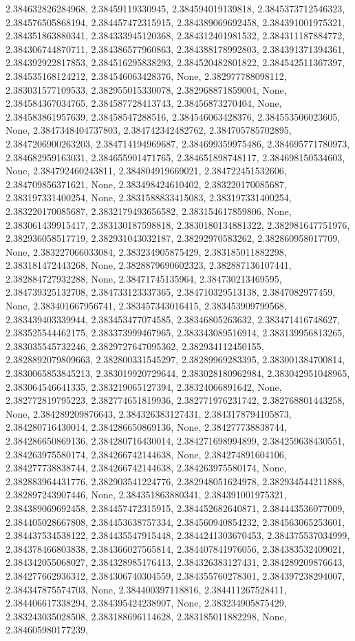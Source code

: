 \documentclass[
  11pt,
  french,
]{article}
\begin{document}
\begin{tcolorbox}[title= Répartition des volumes selon leurs caractéristiques ,colback=boitecode]
2.384632826284968, 2.38459119330945, 2.384594019139818, 2.3845373712546323, 2.384576505868194, 2.384457472315915, 2.384389069692458, 2.384391001975321, 2.384351863880341, 2.384333945120368, 2.384312401981532, 2.384311187884772, 2.384306744870711, 2.384386577960863, 2.384388178992803, 2.384391371394361, 2.384392922817853, 2.384516295838293, 2.384520482801822, 2.384542511367397, 2.384535168124212, 2.384546063428376, None, 2.382977788098112, 2.383031577109533, 2.382955015330078, 2.382968871859004, None, 2.384584367034765, 2.384587728413743, 2.38456873270404, None, 2.384583861957639, 2.38458547288516, 2.384546063428376, 2.384553506023605, None, 2.3847348404737803, 2.384742342482762, 2.384705785702895, 2.3847206900263203, 2.384714194969687, 2.384699359975486, 2.384695771780973, 2.384682959163031, 2.384655901471765, 2.384651898748117, 2.384698150534603, None, 2.384792460243811, 2.384804919669021, 2.384722451532606, 2.384709856371621, None, 2.383498424610402, 2.383220170085687, 2.383197331400254, None, 2.3831588833415083, 2.383197331400254, 2.383220170085687, 2.3832179493656582, 2.383154617859806, None, 2.383061439915417, 2.383130187598818, 2.3830180134881322, 2.382981647751976, 2.382936058517719, 2.382931043032187, 2.38292970583262, 2.382860958017709, None, 2.383227066033084, 2.383234905875429, 2.383185011882298, 2.383181472443268, None, 2.3828879690602323, 2.382887136107441, 2.382884727932288, None, 2.38471745135964, 2.384730213469595, 2.384739325132708, 2.384733123337365, 2.384710329513138, 2.3847082977459, None, 2.383401667956741, 2.383457343016415, 2.383453909799568, 2.383439403339944, 2.383453477074585, 2.38346805263632, 2.383471416748627, 2.383525544462175, 2.383373999467965, 2.383343089516914, 2.383139956813265, 2.383035545732246, 2.3829727647095362, 2.382934112450155, 2.3828892079809663, 2.382800331545297, 2.38289969283395, 2.383001384700814, 2.3830065853845213, 2.383019920729644, 2.383028180962984, 2.383042951048965, 2.383064546641335, 2.383219065127394, 2.38324066891642, None, 2.382772819795223, 2.382774651819936, 2.382771976231742, 2.382768801443258, None, 2.384289209876643, 2.384326383127431, 2.3843178794105873, 2.384280716430014, 2.384286650869136, None, 2.384277738838744, 2.384286650869136, 2.384280716430014, 2.384271698994899, 2.384259638430551, 2.384263975580174, 2.384266742144638, None, 2.384274891604106, 2.384277738838744, 2.384266742144638, 2.384263975580174, None, 2.382883964431776, 2.382903541224776, 2.382948051624978, 2.382934544211888, 2.382897243907446, None, 2.384351863880341, 2.384391001975321, 2.384389069692458, 2.384457472315915, 2.384452682640871, 2.384443536077009, 2.384405028667808, 2.384453638757334, 2.384560940854232, 2.384563065253601, 2.384437534538122, 2.384435547915448, 2.3844241303670453, 2.384375537034999, 2.384378466803838, 2.384366027565814, 2.384407841976056, 2.384383532409021, 2.384342055068027, 2.384328985176413, 2.384326383127431, 2.384289209876643, 2.384277662936312, 2.384306740304559, 2.384355760278301, 2.384397238294007, 2.384347875574703, None, 2.384400397118816, 2.384411267528411, 2.384406617338294, 2.384395424238907, None, 2.383234905875429, 2.383243035028508, 2.383188696114628, 2.383185011882298, None, 2.384605980177239, 
\end{tcolorbox}
\end{document}
